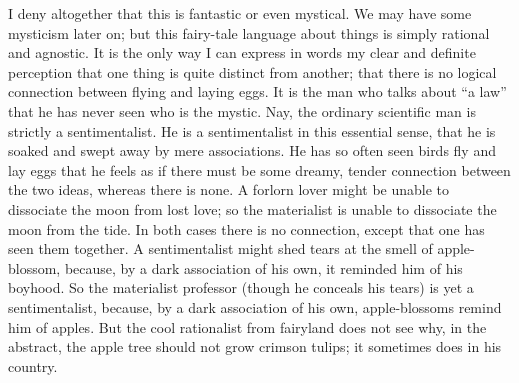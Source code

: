 \documentclass{book}
\begin{document}
I deny altogether that this is fantastic or even mystical. We may have some mysticism later on; but this fairy-tale language about things is simply rational and agnostic. It is the only way I can express in words my clear and definite perception that one thing is quite distinct from another; that there is no logical connection between flying and laying eggs. It is the man who talks about “a law” that he has never seen who is the mystic. Nay, the ordinary scientific man is strictly a sentimentalist. He is a sentimentalist in this essential sense, that he is soaked and swept away by mere associations. He has so often seen birds fly and lay eggs that he feels as if there must be some dreamy, tender connection between the two ideas, whereas there is none. A forlorn lover might be unable to dissociate the moon from lost love; so the materialist is unable to dissociate the moon from the tide. In both cases there is no connection, except that one has seen them together. A sentimentalist might shed tears at the smell of apple-blossom, because, by a dark association of his own, it reminded him of his boyhood. So the materialist professor (though he conceals his tears) is yet a sentimentalist, because, by a dark association of his own, apple-blossoms remind him of apples. But the cool rationalist from fairyland does not see why, in the abstract, the apple tree should not grow crimson tulips; it sometimes does in his country.
\end{document}
